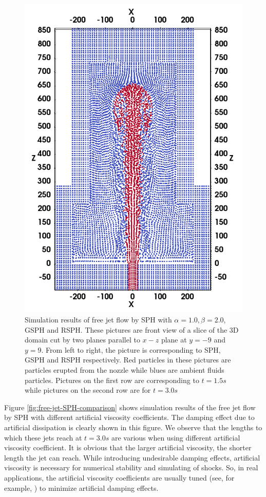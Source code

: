 \begin{figure}
\begin{minipage}[t]{.325\textwidth}
        \includegraphics[width=0.99 \textwidth]{Chapter-4/Figures/RSPH-t3-cutView}
    \end{minipage}%
    \caption{Simulation results of free jet flow by SPH with $\alpha=1.0, \beta=2.0$, GSPH and RSPH. These pictures are front view of a slice of the 3D domain cut by two planes parallel to $x-z$ plane at $y=-9$ and $y=9$. From left to right, the picture is corresponding to SPH, GSPH and RSPH respectively. Red particles in these pictures are particles erupted from the nozzle while blues are ambient fluids particles. Pictures on the first row are corresponding to $t=1.5s$ while pictures on the second row are for $t=3.0 s$}
    \label{fig:free-jet-comparison}
\end{figure}

Figure \ref{fig:free-jet-SPH-comparison} shows simulation results of the free jet flow by SPH with different artificial viscosity coefficients. The damping effect due to artificial dissipation is clearly shown in this figure. We observe that the lengths to which these jets reach at $t=3.0 s$ are various when using different artificial viscosity coefficient. It is obvious that the larger artificial viscosity, the shorter length the jet can reach. While introducing undesirable damping effects, artificial viscosity is necessary for numerical stability and simulating of shocks. So, in real applications, the artificial viscosity coefficients are usually tuned (see, for example, \citep{gmd-2017-119}) to minimize artificial damping effects.

